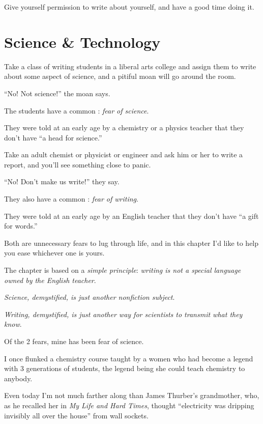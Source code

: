 \documentclass{book}
\numberwithin{equation}{section}
\begin{document}
Give yourself permission to write about yourself, and have a good time doing it.


\chapter{Science \& Technology}

Take a class of writing students in a liberal arts college and assign them to write about some aspect of science, and a pitiful moan will go around the room.

``No! Not science!'' the moan says.

The students have a common : \textit{fear of science}.

They were told at an early age by a chemistry or a physics teacher that they don't have ``a head for science.''

%
Take an adult chemist or physicist or engineer and ask him or her to write a report, and you'll see something close to panic.

``No! Don't make us write!'' they say.

They also have a common : \textit{fear of writing}.

They were told at an early age by an English teacher that they don't have ``a gift for words.''

%
Both are unnecessary fears to lug through life, and in this chapter I'd like to help you ease whichever one is yours.

The chapter is based on a \textit{simple principle}: \textit{writing is not a special language owned by the English teacher}.



\textit{Science, demystified, is just another nonfiction subject}.

\textit{Writing, demystified, is just another way for scientists to transmit what they know}.

%
Of the 2 fears, mine has been fear of science.

I once flunked a chemistry course taught by a women who had become a legend with 3 generations of students, the legend being she could teach chemistry to anybody.

Even today I'm not much farther along than James Thurber's grandmother, who, as he recalled her in \textit{My Life and Hard Times}, thought ``electricity was dripping invisibly all over the house'' from wall sockets.
\end{document}
